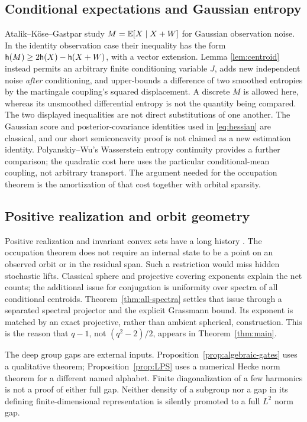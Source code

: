 \subsection{Conditional expectations and Gaussian entropy}
Atalik--K\"ose--Gastpar \cite[Theorem 1 and Proposition 2]{AKG} study
$M=\mathbb E[X\mid X+W]$ for Gaussian observation noise. In the identity
observation case their inequality has the form
$\mathsf h(M)\ge2\mathsf h(X)-\mathsf h(X+W)$, with a vector extension. Lemma
\ref{lem:centroid} instead permits an arbitrary finite conditioning
variable $J$, adds new independent noise \emph{after} conditioning, and
upper-bounds a difference of two smoothed entropies by the martingale
coupling's squared displacement. A discrete $M$ is allowed here, whereas
its unsmoothed differential entropy is not the quantity being compared.
The two displayed inequalities are not direct substitutions of one
another. The Gaussian score and posterior-covariance identities used in
\eqref{eq:hessian} are classical, and our short semiconcavity proof is
not claimed as a new estimation identity. Polyanskiy--Wu's Wasserstein
entropy continuity \cite{PW} provides a further comparison; the quadratic
cost here uses the particular conditional-mean coupling, not arbitrary
transport. The argument needed for the occupation theorem is the
amortization of that cost together with orbital sparsity.

\subsection{Positive realization and orbit geometry}
Positive realization and invariant convex sets have a long history
\cite{Heller,Vidyasagar}. The occupation theorem does not require an
internal state to be a point on an observed orbit or in the residual
span. Such a restriction would miss hidden stochastic lifts. Classical
sphere and projective covering exponents explain the net counts; the
additional issue for conjugation is uniformity over spectra of all
conditional centroids. Theorem~\ref{thm:all-spectra} settles that issue
through a separated spectral projector and the explicit Grassmann bound.
Its exponent is matched by an exact projective, rather than ambient
spherical, construction. This is the reason that $q-1$, not
$(q^2-2)/2$, appears in Theorem~\ref{thm:main}.

The deep group gaps are external inputs. Proposition~\ref{prop:algebraic-gates}
uses a qualitative theorem; Proposition~\ref{prop:LPS} uses a numerical
Hecke norm theorem for a different named alphabet. Finite diagonalization
of a few harmonics is not a proof of either full gap. Neither density of
a subgroup nor a gap in its defining finite-dimensional representation
is silently promoted to a full $L^2$ norm gap.

